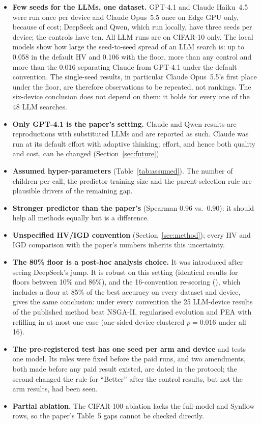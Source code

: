 \begin{itemize}[nosep]
  \item \textbf{Few seeds for the LLMs, one dataset.} GPT-4.1 and Claude Haiku~4.5 were run once per device and Claude Opus~5.5 once on Edge GPU only, because of cost; DeepSeek and Qwen, which run locally, have three seeds per device; the controls have ten. All LLM runs are on CIFAR-10 only. The local models show how large the seed-to-seed spread of an LLM search is: up to 0.058 in the default HV and 0.106 with the floor, more than any control and more than the 0.016 separating Claude from GPT-4.1 under the default convention. The single-seed results, in particular Claude Opus~5.5's first place under the floor, are therefore observations to be repeated, not rankings. The six-device conclusion does not depend on them: it holds for every one of the 48 LLM searches.
  \item \textbf{Only GPT-4.1 is the paper's setting.} Claude and Qwen results are reproductions with substituted LLMs and are reported as such. Claude was run at its default effort with adaptive thinking; effort, and hence both quality and cost, can be changed (Section~\ref{sec:future}).
  \item \textbf{Assumed hyper-parameters} (Table~\ref{tab:assumed}). The number of children per call, the predictor training size and the parent-selection rule are plausible drivers of the remaining gap.
  \item \textbf{Stronger predictor than the paper's} (Spearman 0.96 vs.\ 0.90): it should help all methods equally but is a difference.
  \item \textbf{Unspecified HV/IGD convention} (Section~\ref{sec:method}); every HV and IGD comparison with the paper's numbers inherits this uncertainty.
  \item \textbf{The 80\% floor is a post-hoc analysis choice.} It was introduced after seeing DeepSeek's jump. It is robust on this setting (identical results for floors between 10\% and 86\%), and the 16-convention re-scoring (), which includes a floor at 85\% of the best accuracy on every dataset and device, gives the same conclusion: under every convention the 25 LLM-device results of the published method beat NSGA-II, regularised evolution and PEA with refilling in at most one case (one-sided device-clustered $p=0.016$ under all 16).
  \item \textbf{The pre-registered test has one seed per arm and device} and tests one model. Its rules were fixed before the paid runs, and two amendments, both made before any paid result existed, are dated in the protocol; the second changed the rule for ``Better'' after the control results, but not the arm results, had been seen.
  \item \textbf{Partial ablation.} The CIFAR-100 ablation lacks the full-model and Synflow rows, so the paper's Table~5 gaps cannot be checked directly.
\end{itemize}

